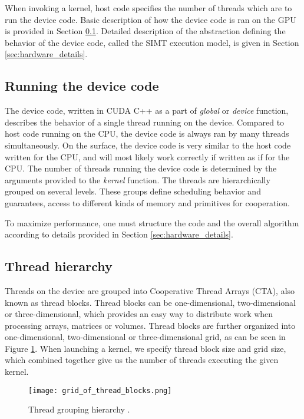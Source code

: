 When invoking a kernel, host code specifies the number of threads which are to run the device code. Basic description of how the device code is ran on the GPU is provided in Section \ref{sec:basic_device_code}. Detailed description of the abstraction defining the behavior of the device code, called the SIMT execution model, is given in Section \ref{sec:hardware_details}.

\subsection{Running the device code}
\label{sec:basic_device_code}

The device code, written in CUDA C++ as a part of \textit{global} or \textit{device} function, describes the behavior of a single thread running on the device. Compared to host code running on the CPU, the device code is always ran by many threads simultaneously. On the surface, the device code is very similar to the host code written for the CPU, and will most likely work correctly if written as if for the CPU. The number of threads running the device code is determined by the arguments provided to the \textit{kernel} function. The threads are hierarchically grouped on several levels. These groups define scheduling behavior and guarantees, access to different kinds of memory and primitives for cooperation.

To maximize performance, one must structure the code and the overall algorithm according to details provided in Section \ref{sec:hardware_details}.



\subsection{Thread hierarchy}
\label{sec:thread_hierarchy}

Threads on the device are grouped into Cooperative Thread Arrays (CTA), also known as thread blocks. Thread blocks can be one-dimensional, two-dimensional or three-dimensional, which provides an easy way to distribute work when processing arrays, matrices or volumes. Thread blocks are further organized into one-dimensional, two-dimensional or three-dimensional grid, as can be seen in Figure \ref{fig:thread_hierarchy}. When launching a kernel, we specify thread block size and grid size, which combined together give us the number of threads executing the given kernel.

\begin{figure}[ht]
	\centering
	\texttt{[image: grid\_of\_thread\_blocks.png]}
	\caption{Thread grouping hierarchy \citep{site:cuda}.}
	\label{fig:thread_hierarchy}
\end{figure}


